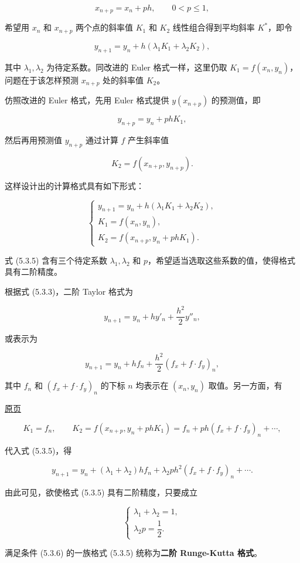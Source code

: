 \documentclass[
  10pt,
  fontset=fandol]{ctexart}
\begin{document}
\[
x_{n+p}=x_n+ph,\qquad 0<p\leqslant1,
\]

希望用 \(x_n\) 和 \(x_{n+p}\) 两个点的斜率值 \(K_1\) 和 \(K_2\) 线性组合得到平均斜率 \(K^*\)，即令

\[
y_{n+1}=y_n+h(\lambda_1K_1+\lambda_2K_2),
\]

其中 \(\lambda_1,\lambda_2\) 为待定系数。同改进的 Euler 格式一样，这里仍取 \(K_1=f(x_n,y_n)\)，问题在于该怎样预测 \(x_{n+p}\) 处的斜率值 \(K_2\)。

仿照改进的 Euler 格式，先用 Euler 格式提供 \(y(x_{n+p})\) 的预测值，即

\[
y_{n+p}=y_n+phK_1,
\]

然后再用预测值 \(y_{n+p}\) 通过计算 \(f\) 产生斜率值

\[
K_2=f(x_{n+p},y_{n+p}).
\]

这样设计出的计算格式具有如下形式：

\[
\begin{cases}
y_{n+1}=y_n+h(\lambda_1K_1+\lambda_2K_2),\\
K_1=f(x_n,y_n),\\
K_2=f(x_{n+p},y_n+phK_1).
\end{cases}\tag{5.3.5}
\]

式 (5.3.5) 含有三个待定系数 \(\lambda_1,\lambda_2\) 和 \(p\)，希望适当选取这些系数的值，使得格式具有二阶精度。

根据式 (5.3.3)，二阶 Taylor 格式为

\[
y_{n+1}=y_n+hy'_n+\frac{h^2}{2}y''_n,
\]

或表示为

\[
y_{n+1}=y_n+hf_n+\frac{h^2}{2}(f_x+f\cdot f_y)_n,
\]

其中 \(f_n\) 和 \((f_x+f\cdot f_y)_n\) 的下标 \(n\) 均表示在 \((x_n,y_n)\) 取值。另一方面，有

\href{../../source-images/pdf-129.jpeg}{原页}

\[
K_1=f_n,\qquad K_2=f(x_{n+p},y_n+phK_1)=f_n+ph(f_x+f\cdot f_y)_n+\cdots,
\]

代入式 (5.3.5)，得

\[
y_{n+1}=y_n+(\lambda_1+\lambda_2)hf_n+\lambda_2ph^2(f_x+f\cdot f_y)_n+\cdots.
\]

由此可见，欲使格式 (5.3.5) 具有二阶精度，只要成立

\[
\begin{cases}
\lambda_1+\lambda_2=1,\\
\lambda_2p=\dfrac{1}{2}.
\end{cases}\tag{5.3.6}
\]

满足条件 (5.3.6) 的一族格式 (5.3.5) 统称为\textbf{二阶 Runge-Kutta 格式}。
\end{document}
